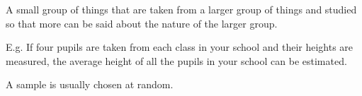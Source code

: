 A small group of things that are taken from a larger group of things and 
studied so that more can be said about the nature of the larger group.

\par
E.g. If four pupils are taken from each class in your school and their heights 
are measured, the average height of all the pupils in your school can be estimated. 
 
\par
A sample is usually chosen at random.